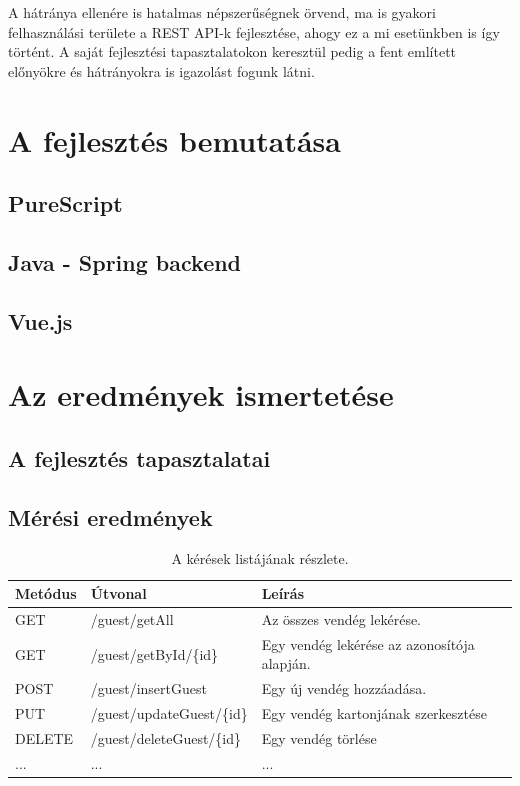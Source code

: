 \documentclass[12pt]{article}
\begin{document}
A hátránya ellenére is hatalmas népszerűségnek örvend, ma is gyakori felhasználási területe a REST API-k fejlesztése, ahogy ez a mi esetünkben is így történt. A saját fejlesztési tapasztalatokon keresztül pedig a fent említett előnyökre és hátrányokra is igazolást fogunk látni.

\newpage
\section{A fejlesztés bemutatása}

\subsection{PureScript}

\subsection{Java - Spring backend}

\subsection{Vue.js}

\section{Az eredmények ismertetése}
\subsection{A fejlesztés tapasztalatai}
\subsection{Mérési eredmények}

\begin{table}[h!]
\centering
\begin{tabular}{ |p{1.7cm}|p{4.4cm}|p{6.3cm}| } 
\hline
 \textbf{Metódus} & \textbf{Útvonal} &\textbf{Leírás}\\
\hline
GET & /guest/getAll& Az összes vendég lekérése.\\
\hline
GET & /guest/getById/\{id\}& Egy vendég lekérése az azonosítója alapján.\\
\hline
POST & /guest/insertGuest&  Egy új vendég hozzáadása. \\
\hline
PUT & /guest/updateGuest/\{id\} & Egy vendég kartonjának szerkesztése \\
\hline
DELETE & /guest/deleteGuest/\{id\} & Egy vendég törlése  \\
\hline
... & ... &...  \\
\hline
\end{tabular}
\caption{A kérések listájának részlete.}
\end{table}
\end{document}
